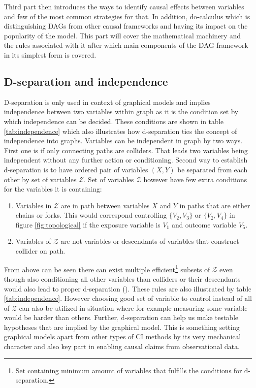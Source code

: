 \documentclass[main=english,12pt,a4paper,pdftex,econ,utf8]{aaltothesis}
\newcommand{\z}{\mathcal{Z}}
\begin{document}
Third part then introduces the ways to identify causal effects between variables and few of the most common strategies for that. In addition, do-calculus which is distinguishing DAGs from other causal frameworks and having its impact on the popularity of the model. This part will cover the mathematical machinery and the rules associated with it after which main components of the DAG framework in its simplest form is covered.

\subsection{D-separation and independence} \label{subsection:d and indep}

D-separation is only used in context of graphical models and implies independence between two variables within graph as it is the condition set by which independence can be decided. These conditions are shown in table \ref{tab:independence} which also illustrates how d-separation ties the concept of independence into graphs. Variables can be independent in graph by two ways. First one is if only connecting paths are colliders. That leads two variables being independent without any further action or conditioning. Second way to establish d-separation is to have ordered pair of variables $(X, Y)$ be separated from each other by set of variables $\z$. Set of variables $\z$ however have few extra conditions for the variables it is containing:

\begin{enumerate}
    \item Variables in $\z$ are in path between variables $X$ and $Y$ in paths that are either chains or forks. This would correspond controlling $\{V_{2},V_{3}\}$ or $\{V_{2},V_{4}\}$ in figure \ref{fig:topological} if the exposure variable is $V_{1}$ and outcome variable $V_{5}$.
    \item Variables of $\z$ are not variables or descendants of variables that construct collider on path.
\end{enumerate}

From above can be seen there can exist multiple efficient\footnote{Set containing minimum amount of variables that fulfills the conditions for d-separation.} subsets of $\z$ even though also conditioning all other variables than colliders or their descendants would also lead to proper d-separation (\cite{Pearl2016}). These rules are also illustrated by table \ref{tab:independence}. However choosing good set of variable to control instead of all of $\z$ can also be utilized in situation where for example measuring some variable would be harder than others. Further, d-separation can help us make testable hypotheses that are implied by the graphical model. This is something setting graphical models apart from other types of CI methods by its very mechanical character and also key part in enabling causal claims from observational data.
\end{document}
